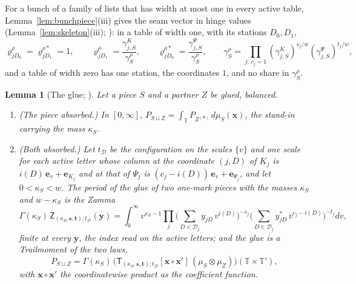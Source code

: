 \documentclass[11pt]{article}
\theoremstyle{plain}
\newtheorem{lemma}[prop]{Lemma}
\theoremstyle{definition}
\theoremstyle{remark}
\newcommand{\cD}{\mathcal D}
\newcommand{\TT}{\mathbb T}
\newcommand{\bx}{\mathbf x}
\newcommand{\sZ}{\mathsf Z}
\newcommand{\sT}{\mathsf T}
\begin{document}
For a bunch of a family of lists that has width at most one in every active table, Lemma~\ref{lem:bunchpiece}(iii) gives the seam vector in hinge values (Lemma~\ref{lem:skeleton}(iii); \cite[Def.~27.5, p.~227; Prop.~27.10, p.~231]{F}): in a table of width one, with its stations $D_0,D_1$,
\[
\varrho^\rho_{jD_0}=\varrho^{\rho\ast}_{jD_1}=1,\qquad \varrho^\rho_{jD_1}=\frac{\gamma^K_{j,S}}{\gamma^\rho_S},\qquad \varrho^{\rho\ast}_{jD_0}=\frac{\gamma^\Psi_{j,S}}{\gamma^\rho_S},\qquad \gamma^\rho_S=\prod_{j:\,c_j=1}(\gamma^K_{j,S})^{s_j/w}(\gamma^\Psi_{j,S})^{t_j/w},
\]
and a table of width zero has one station, the coordinates $1$, and no share in $\gamma^\rho_S$.

\begin{lemma}[The glue; {\cite[Lemma~27.8, p.~229; Thm.~27.9(i),(ii), p.~230]{F}}]\label{lem:glue}
Let a piece $S$ and a partner $Z$ be glued, balanced.
\begin{enumerate}[label=(\roman*)]
\item (\emph{The piece absorbed.}) In $[0,\infty]$, $\displaystyle P_{S\sqcup Z}=\int_{\TT}P_{Z^{(\bx)}}\,d\mu_S(\bx)$, the stand-in carrying the mass $\kappa_S$.
\item (\emph{Both absorbed.}) Let $t_{\cD}$ be the configuration on the scales $\{v\}$ and one scale for each active letter whose column at the coordinate $(j,D)$ of $K_j$ is $i(D)\,\mathbf e_v+\mathbf e_{K_j}$ and at that of $\Psi_j$ is $(c_j-i(D))\,\mathbf e_v+\mathbf e_{\Psi_j}$, and let $0<\kappa_S<w$. The period of the glue of two one-mark pieces with the masses $\kappa_S$ and $w-\kappa_S$ is the Zamma
\[
\Gamma(\kappa_S)\,\sZ_{(\kappa_S,\mathbf s,\mathbf t);t_{\cD}}(\mathbf y)=\int_0^\infty v^{\kappa_S-1}\prod_j\Big(\sum_{D\in\cD_j}y_{jD}\,v^{i(D)}\Big)^{-s_j}\Big(\sum_{D\in\cD_j}y^\ast_{jD}\,v^{c_j-i(D)}\Big)^{-t_j}dv,
\]
finite at every $\mathbf y$, the index read on the active letters; and the glue is a Trailmoment of the two laws,
\[
P_{S\sqcup Z}=\Gamma(\kappa_S)\,\big(\sT_{(\kappa_S,\mathbf s,\mathbf t);t_{\cD}}[\bx\circ\bx']\,(\mu_S\otimes\mu_Z)\big)(\TT\times\TT'),
\]
with $\bx\circ\bx'$ the coordinatewise product as the coefficient function.
\end{enumerate}
\end{lemma}
\end{document}
